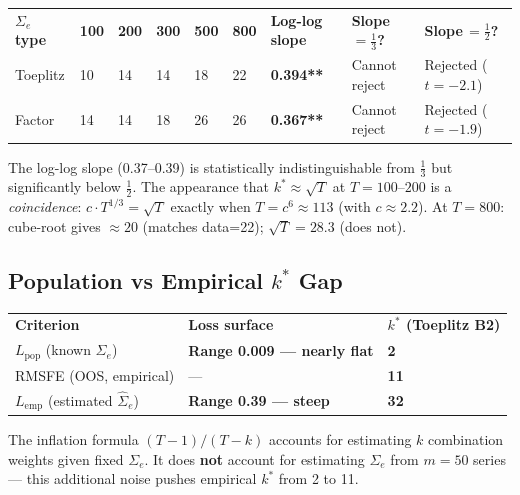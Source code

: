 \documentclass[11pt,a4paper]{article}
\newcommand{\ck}[1]{\textcolor{mygreen}{\textbf{#1}}}
\newcommand{\pa}[1]{\textcolor{myamber}{\textbf{#1}}}
\newcommand{\no}[1]{\textcolor{myred}{\textbf{#1}}}
\newcommand{\kstar}{k^*}
\newcommand{\Sige}{\Sigma_e}
\begin{document}
\smallskip
\begin{tabular}{L{1.8cm} C{0.7cm} C{0.7cm} C{0.7cm} C{0.7cm} C{0.7cm} C{1.6cm} C{1.5cm} C{1.7cm}}
\color{white}\bfseries \(\Sige\) type &
\color{white}\bfseries 100 &
\color{white}\bfseries 200 &
\color{white}\bfseries 300 &
\color{white}\bfseries 500 &
\color{white}\bfseries 800 &
\color{white}\bfseries Log-log slope &
\color{white}\bfseries Slope\,\(=\tfrac{1}{3}\)? &
\color{white}\bfseries Slope\,\(=\tfrac{1}{2}\)? \\
Toeplitz & 10 & 14 & 14 & 18 & 22 & \ck{0.394**} & Cannot reject & Rejected (\(t=-2.1\)) \\
Factor   & 14 & 14 & 18 & 26 & 26 & \ck{0.367**} & Cannot reject & Rejected (\(t=-1.9\)) \\
\end{tabular}

\smallskip\noindent
The log-log slope (0.37--0.39) is statistically indistinguishable from \(\tfrac{1}{3}\) but
significantly below \(\tfrac{1}{2}\).
The appearance that \(\kstar\approx\sqrt{T}\) at \(T=100\text{--}200\) is a \emph{coincidence}:
\(c\cdot T^{1/3}=\sqrt{T}\) exactly when \(T=c^6\approx113\) (with \(c\approx2.2\)).
At \(T=800\): cube-root gives \(\approx20\) (matches data=22); \(\sqrt{T}=28.3\) (does not).

\subsection{Population vs Empirical \(\kstar\) Gap}

\smallskip
\begin{tabular}{L{5.0cm} C{3.5cm} C{2.0cm}}
\color{white}\bfseries Criterion &
\color{white}\bfseries Loss surface &
\color{white}\bfseries \(\kstar\) (Toeplitz B2) \\
\(L_{\mathrm{pop}}\) (known \(\Sige\)) & \pa{Range 0.009 — nearly flat} & \pa{2} \\
RMSFE (OOS, empirical) & --- & \textbf{11} \\
\(L_{\mathrm{emp}}\) (estimated \(\hat\Sigma_e\)) & \no{Range 0.39 — steep} & \no{32} \\
\end{tabular}

\smallskip\noindent
The inflation formula \((T-1)/(T-k)\) accounts for estimating \(k\) combination weights given fixed \(\Sige\).
It does \textbf{not} account for estimating \(\Sige\) from \(m=50\) series —
this additional noise pushes empirical \(\kstar\) from 2 to 11.
\end{document}
